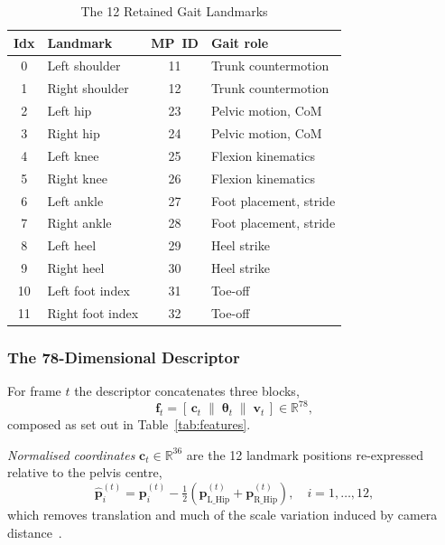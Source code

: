 \documentclass[journal]{IEEEtran}
\newcommand{\tabhead}[1]{\textbf{#1}}
\begin{document}
\begin{table}[!t]
\caption{The 12 Retained Gait Landmarks}
\label{tab:landmarks}
\centering
\small
\begin{tabular}{@{}clcl@{}}
\toprule
\tabhead{Idx} & \tabhead{Landmark} & \tabhead{MP~ID} & \tabhead{Gait role} \\
\midrule
0  & Left shoulder    & 11 & Trunk countermotion \\
1  & Right shoulder   & 12 & Trunk countermotion \\
2  & Left hip         & 23 & Pelvic motion, CoM \\
3  & Right hip        & 24 & Pelvic motion, CoM \\
4  & Left knee        & 25 & Flexion kinematics \\
5  & Right knee       & 26 & Flexion kinematics \\
6  & Left ankle       & 27 & Foot placement, stride \\
7  & Right ankle      & 28 & Foot placement, stride \\
8  & Left heel        & 29 & Heel strike \\
9  & Right heel       & 30 & Heel strike \\
10 & Left foot index  & 31 & Toe-off \\
11 & Right foot index & 32 & Toe-off \\
\bottomrule
\end{tabular}
\end{table}

\subsubsection{The 78-Dimensional Descriptor}
For frame $t$ the descriptor concatenates three blocks,
\begin{equation}
\mathbf{f}_t = \left[\, \mathbf{c}_t \;\|\; \boldsymbol{\theta}_t \;\|\;
\mathbf{v}_t \,\right] \in \mathbb{R}^{78},
\end{equation}
composed as set out in Table~\ref{tab:features}.

\emph{Normalised coordinates} $\mathbf{c}_t \in \mathbb{R}^{36}$ are the 12
landmark positions re-expressed relative to the pelvis centre,
\begin{equation}
\hat{\mathbf{p}}_i^{(t)} = \mathbf{p}_i^{(t)} -
\tfrac{1}{2}\left(\mathbf{p}_{\text{L\_Hip}}^{(t)} +
\mathbf{p}_{\text{R\_Hip}}^{(t)}\right),
\quad i = 1,\dots,12,
\end{equation}
which removes translation and much of the scale variation induced by camera
distance~\cite{gaitgraph,gaitpt}.
\end{document}
